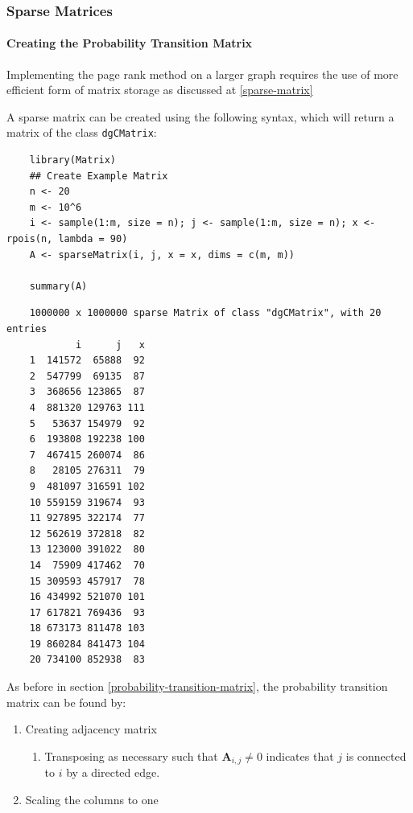 \documentclass[11pt]{report}
\begin{document}
\subsubsection{Sparse Matrices}
\label{sec:sparse-mat-random-surf}
\paragraph{Creating the Probability Transition Matrix}
\label{sec:org04def23}
Implementing the page rank method on a larger graph requires the use of more
efficient form of matrix storage as discussed at \ref{sparse-matrix}

A sparse matrix can be created using the following syntax, which will return a
matrix of the class \texttt{dgCMatrix}:

\begin{tcolorbox}
    \begin{verbatim}
    library(Matrix)
    ## Create Example Matrix
    n <- 20
    m <- 10^6
    i <- sample(1:m, size = n); j <- sample(1:m, size = n); x <- rpois(n, lambda = 90)
    A <- sparseMatrix(i, j, x = x, dims = c(m, m))

    summary(A)
    \end{verbatim}
\tcblower
    \begin{verbatim}
    1000000 x 1000000 sparse Matrix of class "dgCMatrix", with 20 entries
            i      j   x
    1  141572  65888  92
    2  547799  69135  87
    3  368656 123865  87
    4  881320 129763 111
    5   53637 154979  92
    6  193808 192238 100
    7  467415 260074  86
    8   28105 276311  79
    9  481097 316591 102
    10 559159 319674  93
    11 927895 322174  77
    12 562619 372818  82
    13 123000 391022  80
    14  75909 417462  70
    15 309593 457917  78
    16 434992 521070 101
    17 617821 769436  93
    18 673173 811478 103
    19 860284 841473 104
    20 734100 852938  83
    \end{verbatim}
\end{tcolorbox}

As before in section \ref{probability-transition-matrix}, the probability transition matrix can be found by:

\begin{enumerate}
\item Creating adjacency matrix
\begin{enumerate}
\item Transposing as necessary such that \(\mathbf{A}_{i,j}\neq 0\) indicates that \(j\) is connected to \(i\) by a directed edge.
\end{enumerate}
\item Scaling the columns to one
\end{enumerate}
\end{document}

